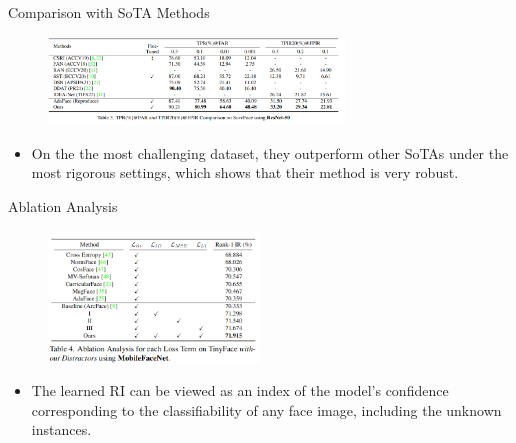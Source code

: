 \documentclass[aspectratio=169,xcolor=dvipsnames]{beamer}
\begin{document}

\begin{frame}{Comparison with SoTA Methods}
    \begin{figure}
        \centering
        \includegraphics[width=0.7\textwidth]{imgs/04_Table_3_SurvFace.png}
        \label{fig:t3-survface}
    \end{figure}
    \begin{itemize}
        \item On the the most challenging dataset, they outperform other SoTAs under the most rigorous settings, which shows that their method is very robust. 
    \end{itemize}
\end{frame}



\begin{frame}{Ablation Analysis}
    \begin{figure}
        \centering
        \includegraphics[width=0.5\textwidth]{imgs/05_Table_4_AA.png}
        \label{fig:t4-aa}
    \end{figure}
    \begin{itemize}
        \item The learned RI can be viewed as an index of the model’s confidence corresponding to the classifiability of any face image, including the unknown instances.
    \end{itemize}
\end{frame}
\end{document}
